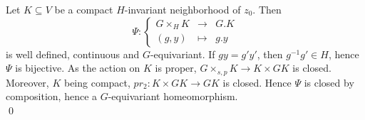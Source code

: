 \begin{dem}
Let $K\subseteq V$ be a compact $H$-invariant neighborhood of $z_0$. Then   
\[\Psi : \left\{ \begin{array}{rcl}
G\times_H K & \rightarrow & G.K \\ 
(g,y) & \mapsto & g.y \end{array}\right.\]
is well defined, continuous and $G$-equivariant. If $gy =g'y' $, then $g^{-1}g'\in H$, hence $\Psi$ is bijective. As the action on $K$ is proper, $G\times_{s,p} K \rightarrow K\times GK$ is closed. Moreover, $K$ being compact, $pr_2 : K\times GK \rightarrow GK$ is closed. Hence $\Psi$ is closed by composition, hence a $G$-equivariant homeomorphism. \\
\qed
\end{dem}

